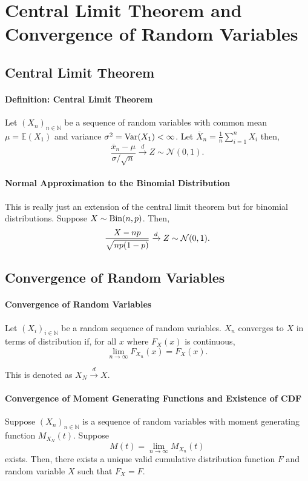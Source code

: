 \section{Central Limit Theorem and Convergence of Random Variables}

\subsection{Central Limit Theorem}

\paragraph{Definition: Central Limit Theorem}
Let \( (X_n)_{n \in  \mathbb{N}} \) be a sequence of random variables
with common mean  \( \mu = \mathbb{E}(X_1)  \) and variance
\( \sigma^2 = \mathrm{Var}(X_1) < \infty\).
Let \( \overline{X}_n = \frac{1}{n} \sum_{i=1}^n X_i \) then, \[
    \frac{\overline{x}_n - \mu}{\sigma / \sqrt{ n }}
    \xrightarrow{d}  Z \sim \mathcal{N}(0, 1)
.\]

\paragraph{Normal Approximation to the Binomial Distribution}
This is really just an extension of the central limit theorem but for
binomial distributions.
Suppose \( X \sim \mathrm{Bin}(n, p) \). Then, \[
    \frac{X - np}{\sqrt{np(1- p)}} \xrightarrow{d} Z \sim \mathcal{N}(0, 1)
.\]

\subsection{Convergence of Random Variables}

\paragraph{Convergence of Random Variables}
Let \( (X_i)_{i \in  \mathbb{N}} \) be a random sequence of random variables.
\( X_n \) converges to  \( X \) in terms of distribution if,
for all \( x \) where  \( F_X(x) \) is continuous,  \[
    \lim_{n \to  \infty} F_{X_n}(x) = F_X(x)
.\]

This is denoted as \( X_N \xrightarrow{d} X \).

\paragraph{Convergence of Moment Generating Functions and Existence of CDF}
Suppose \( (X_n)_{n \in  \mathbb{N}} \) is a sequence of random variables with
moment generating function  \( M_{X_N}(t) \).
Suppose  \[
    M(t) = \lim_{n \to \infty} M_{X_n}(t)
\]
exists. Then, there exists a unique valid cumulative distribution function
\( F \)  and random variable  \( X \) such that
 \( F_X = F \).

